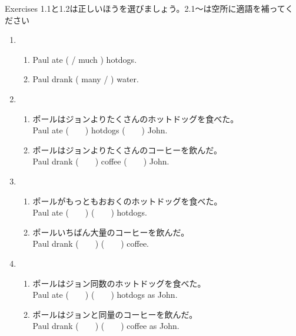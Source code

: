 \documentclass[aspectratio=169,xcolor={dvipsnames,table}]{beamer}
\begin{document}
\begin{frame}[plain]{Exercises}
1.1と1.2は正しいほうを選びましょう。2.1～は空所に適語を補ってください%
\hfill{\scriptsize {}}
 \begin{enumerate}
  \item \begin{enumerate}
	 \item<1-> Paul ate (  / much ) hotdogs.
	 \item<1-> Paul drank ( many / ) water.
	\end{enumerate}
  \item \begin{enumerate}
	 \item<1-> ポールはジョンよりたくさんのホットドッグを食べた。\\
	       Paul ate (~~~~) hotdogs (~~~~) John.
	 \item<1-> ポールはジョンよりたくさんのコーヒーを飲んだ。\\
	       Paul drank (~~~~) coffee (~~~~) John.
	\end{enumerate}
  \item \begin{enumerate}
	 \item<1-> ポールがもっともおおくのホットドッグを食べた。\\
	       Paul ate (~~~~) (~~~~) hotdogs.
	 \item<1-> ポールいちばん大量のコーヒーを飲んだ。\\
	       Paul drank (~~~~) (~~~~) coffee.
	\end{enumerate}
  \item \begin{enumerate}
	 \item<1-> ポールはジョン同数のホットドッグを食べた。\\
	       Paul ate (~~~~) (~~~~) hotdogs as John.
	 \item<1-> ポールはジョンと同量のコーヒーを飲んだ。\\
	       Paul drank (~~~~) (~~~~) coffee as John.
	\end{enumerate}
 \end{enumerate}
\end{frame}
\end{document}
